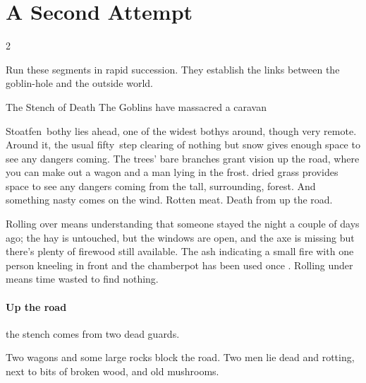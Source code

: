 \section{A Second Attempt}
\label{goblinsBegin}

\begin{multicols}{2}
\renewcommand\npcsymbol{\gls{morning}}


\noindent
Run these \glspl{segment} in rapid succession.
They establish the links between the goblin-hole and the outside world.


{The Stench of Death}%
{The Goblins have massacred a caravan}%

\begin{boxtext}
  Stoatfen~\Gls{bothy} lies ahead, one of the widest \glspl{bothy} around, though very remote.
  Around it, the usual fifty~\gls{step} clearing of nothing but
  \ifnum{}%
    snow gives enough space to see any dangers coming.  The trees' bare
    branches grant vision up the road, where you can make out a wagon and a man
    lying in the frost.
  \else%
    dried grass provides space to see any dangers coming from the tall,
    surrounding, forest.  And something nasty comes on the wind.  Rotten meat.
    Death from up the road.
  \fi%
\end{boxtext}

\label{missingAxe}
Rolling over means understanding that someone stayed the night a couple of days ago;
the hay is untouched, but the windows are open, and the axe is missing
\ifnum{}%
  but there's plenty of firewood still available.
  The ash indicating a small fire with one person kneeling in front%
\else%
  and the chamberpot has been used once%
\fi.
Rolling under means time wasted to find nothing.

\paragraph{Up the road}
the stench comes from two dead \glspl{guard}.

\begin{boxtext}
  Two wagons and some large rocks block the road.
  Two men lie dead and rotting, next to bits of broken wood, and old mushrooms.
\end{boxtext}


\end{multicols}
